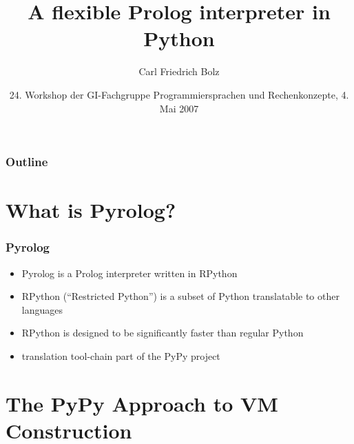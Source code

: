 \documentclass[utf8]{beamer}
\title{A flexible Prolog interpreter in Python}
\author{Carl Friedrich Bolz}
\institute[Heinrich-Heine-Universität Düsseldorf]
{
  Institut für Informatik\\
  Heinrich-Heine-Universität Düsseldorf
}
\date{24. Workshop der GI-Fachgruppe Programmiersprachen und Rechenkonzepte, 4. Mai 2007}
\begin{document}
\begin{frame}
  \titlepage
\end{frame}

\begin{frame}
  \frametitle{Outline}
  \tableofcontents
\end{frame}





\section{What is Pyrolog?}

\begin{frame}
  \frametitle{Pyrolog}

  \begin{itemize}
  \item
    Pyrolog is a Prolog interpreter written in RPython
  \item
    RPython (``Restricted Python'') is a subset of Python translatable to other
    languages
  \item
    RPython is designed to be significantly faster than regular Python
  \item
    translation tool-chain part of the PyPy project
  \end{itemize}
\end{frame}

\section{The PyPy Approach to VM Construction}
\end{document}
